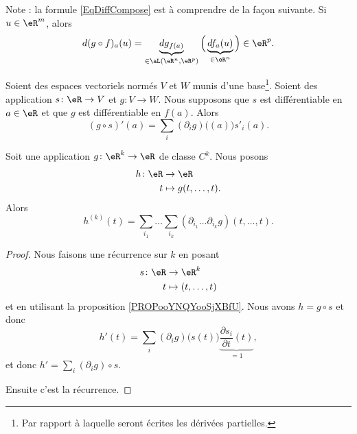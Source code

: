\begin{remark}
	Note : la formule \eqref{EqDiffCompose} est à comprendre de la façon suivante. Si \( u\in\eR^m\), alors
	\begin{equation}
		d(g\circ f)_a(u)=\underbrace{dg_{f(a)}}_{\in\aL(\eR^n,\eR^p)}\Big( \underbrace{df_a(u)}_{\in\eR^n} \Big)\in\eR^p.
	\end{equation}
\end{remark}

\begin{proposition}	\label{PROPooYNQYooSjXBfU}
	Soient des espaces vectoriels normés \( V\) et \( W\) munis d'une base\footnote{Par rapport à laquelle seront écrites les dérivées partielles.}. Soient des application \(s \colon \eR\to V  \) et \(g \colon V\to W  \). Nous supposons que \( s\) est différentiable en \( a\in \eR\) et que \( g\) est différentiable en \( f(a)\). Alors
	\begin{equation}
		(g\circ s)'(a)=\sum_i(\partial_ig)\big( (a) \big)s'_i(a).
	\end{equation}
\end{proposition}

\begin{proposition}	\label{PROPooXAGQooRLMshw}
	Soit une application \(g \colon \eR^k\to \eR  \) de classe \( C^k\). Nous posons
	\begin{equation}
		\begin{aligned}
			h\colon \eR & \to \eR                \\
			t           & \mapsto g(t,\ldots,t).
		\end{aligned}
	\end{equation}
	Alors
	\begin{equation}
		h^{(k)}(t)=\sum_{i_1}\ldots \sum_{i_k}(\partial_{i_1}\ldots \partial_{i_k}g)(t,\ldots,t).
	\end{equation}
\end{proposition}

\begin{proof}
	Nous faisons une récurrence sur \( k\) en posant
	\begin{equation}
		\begin{aligned}
			s\colon \eR & \to \eR^k            \\
			t           & \mapsto (t,\ldots,t)
		\end{aligned}
	\end{equation}
	et en utilisant la proposition \ref{PROPooYNQYooSjXBfU}. Nous avons \( h=g\circ s\) et donc
	\begin{equation}
		h'(t)=\sum_i(\partial_ig)\big( s(t) \big)\underbrace{\frac{ \partial s_i }{ \partial t }(t)}_{=1},
	\end{equation}
	et donc \( h'=\sum_i(\partial_ig)\circ s\).

	Ensuite c'est la récurrence.
\end{proof}

